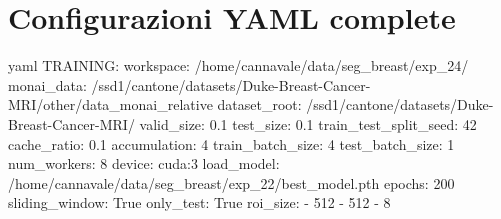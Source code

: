 \appendix

\chapter{Configurazioni YAML complete}
\tiny
\begin{code}{yaml}
    TRAINING:
  workspace: /home/cannavale/data/seg_breast/exp_24/                                                     
  monai_data: /ssd1/cantone/datasets/Duke-Breast-Cancer-MRI/other/data_monai_relative                  
  dataset_root: /ssd1/cantone/datasets/Duke-Breast-Cancer-MRI/                                        
  valid_size: 0.1
  test_size: 0.1                                                        
  train_test_split_seed: 42                                                                             
  cache_ratio: 0.1                                                                                     
  accumulation: 4                                                                                      
  train_batch_size: 4                                                                                  
  test_batch_size: 1                                                                                   
  num_workers: 8                                                                                 
  device: cuda:3                                                                    
  load_model: /home/cannavale/data/seg_breast/exp_22/best_model.pth                                                                                      
  epochs: 200                                                                                            
  sliding_window: True  
  only_test: True                                                                               
  roi_size: 
    - 512
    - 512
    - 8                                                                                       
  

\end{code}
